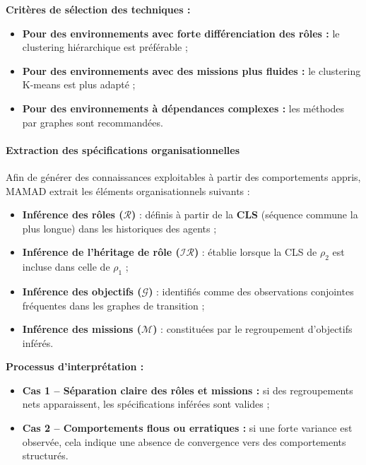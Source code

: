 \vspace{0.4em}
\noindent \textbf{Critères de sélection des techniques :}
\begin{itemize}
    \item \textbf{Pour des environnements avec forte différenciation des rôles :} le clustering hiérarchique est préférable ;
    \item \textbf{Pour des environnements avec des missions plus fluides :} le clustering K-means est plus adapté ;
    \item \textbf{Pour des environnements à dépendances complexes :} les méthodes par graphes sont recommandées.
\end{itemize}

\paragraph{Extraction des spécifications organisationnelles}

Afin de générer des connaissances exploitables à partir des comportements appris, MAMAD extrait les éléments organisationnels suivants :

\begin{itemize}
    \item \textbf{Inférence des rôles ($\mathcal{R}$)} : définis à partir de la \textbf{CLS} (séquence commune la plus longue) dans les historiques des agents ;
    \item \textbf{Inférence de l'héritage de rôle ($\mathcal{IR}$)} : établie lorsque la CLS de $\rho_2$ est incluse dans celle de $\rho_1$ ;
    \item \textbf{Inférence des objectifs ($\mathcal{G}$)} : identifiés comme des observations conjointes fréquentes dans les graphes de transition ;
    \item \textbf{Inférence des missions ($\mathcal{M}$)} : constituées par le regroupement d'objectifs inférés.
\end{itemize}

\vspace{0.4em}
\noindent \textbf{Processus d'interprétation :}
\begin{itemize}
    \item \textbf{Cas 1 – Séparation claire des rôles et missions :} si des regroupements nets apparaissent, les spécifications inférées sont valides ;
    \item \textbf{Cas 2 – Comportements flous ou erratiques :} si une forte variance est observée, cela indique une absence de convergence vers des comportements structurés.
\end{itemize}

